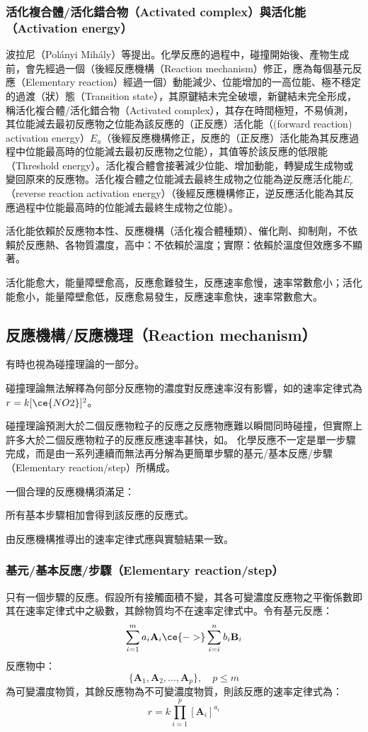 \documentclass[a4paper,12pt]{article}
\begin{document}
\subsubsection{活化複合體/活化錯合物（Activated complex）與活化能（Activation energy）}
波拉尼（Polányi Mihály）等提出。化學反應的過程中，碰撞開始後、產物生成前，會先經過一個（後經反應機構（Reaction mechanism）修正，應為每個基元反應（Elementary reaction）經過一個）動能減少、位能增加的一高位能、極不穩定的過渡（狀）態（Transition state），其原鍵結未完全破壞，新鍵結未完全形成，稱活化複合體/活化錯合物（Activated complex），其存在時間極短，不易偵測，其位能減去最初反應物之位能為該反應的（正反應）活化能（(forward reaction) activation energy）$E_a$（後經反應機構修正，反應的（正反應）活化能為其反應過程中位能最高時的位能減去最初反應物之位能），其值等於該反應的低限能（Threshold energy）。活化複合體會接著減少位能、增加動能，轉變成生成物或變回原來的反應物。活化複合體之位能減去最終生成物之位能為逆反應活化能$E_r$（reverse reaction activation energy）（後經反應機構修正，逆反應活化能為其反應過程中位能最高時的位能減去最終生成物之位能）。

活化能依賴於反應物本性、反應機構（活化複合體種類）、催化劑、抑制劑，不依賴於反應熱、各物質濃度，高中：不依賴於溫度；實際：依賴於溫度但效應多不顯著。

活化能愈大，能量障壁愈高，反應愈難發生，反應速率愈慢，速率常數愈小；活化能愈小，能量障壁愈低，反應愈易發生，反應速率愈快，速率常數愈大。
\subsection{反應機構/反應機理（Reaction mechanism）}
有時也視為碰撞理論的一部分。
\bit
\item 碰撞理論無法解釋為何部分反應物的濃度對反應速率沒有影響，如的速率定律式為$r=k[\ce{NO2}]^2$。
\item 碰撞理論預測大於二個反應物粒子的反應之反應物應難以瞬間同時碰撞，但實際上許多大於二個反應物粒子的反應反應速率甚快，如。
\eit
{}
化學反應不一定是單一步驟完成，而是由一系列連續而無法再分解為更簡單步驟的基元/基本反應/步驟（Elementary reaction/step）所構成。

一個合理的反應機構須滿足：
\bit
\item 所有基本步驟相加會得到該反應的反應式。
\item 由反應機構推導出的速率定律式應與實驗結果一致。
\eit
\subsubsection{基元/基本反應/步驟（Elementary reaction/step）}
只有一個步驟的反應。假設所有接觸面積不變，其各可變濃度反應物之平衡係數即其在速率定律式中之級數，其餘物質均不在速率定律式中。令有基元反應：
\[\sum_{i=1}^ma_i\mathbf{A}_i\ce{->}\sum_{i=i}^nb_i\mathbf{B}_i\]
反應物中：
\[\{\mathbf{A}_1,\mathbf{A}_2,\ldots,\mathbf{A}_p\},\quad p\leq m\]
為可變濃度物質，其餘反應物為不可變濃度物質，則該反應的速率定律式為：
\[r=k\prod_{i=1}^p[\mathbf{A}_i]^{a_i}\]
\end{document}
